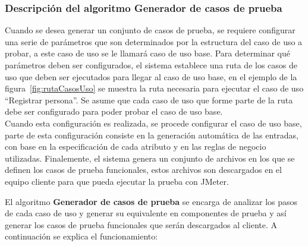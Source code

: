 	\newpage

	\subsubsection{Descripción del algoritmo Generador de casos de prueba}
	
	Cuando se desea generar un conjunto de casos de prueba, se requiere configurar una serie de parámetros que son determinados por la estructura del caso de uso a probar, a este caso de uso se le llamará caso de uso base. Para determinar qué parámetros deben ser configurados, el sistema establece una ruta de los casos de uso que deben ser ejecutados para llegar al caso de uso base, en el ejemplo de la figura~\ref{fig:rutaCasosUso} se muestra la ruta necesaria para ejecutar el caso de uso ``Registrar persona''. Se asume que cada caso de uso que forme parte de la ruta debe ser configurado para poder probar el caso de uso base. \\
	Cuando esta configuración es realizada, se procede configurar el caso de uso base, parte de esta configuración consiste en la generación automática de las entradas, con base en la especificación de cada atributo y en las reglas de negocio utilizadas. Finalemente, el sistema genera un conjunto de archivos en los que se definen los casos de prueba funcionales, estos archivos son descargados en el equipo cliente para que pueda ejecutar la prueba con JMeter.
	
	
	
	El algoritmo {\bf Generador de casos de prueba} se encarga de analizar los pasos de cada caso de uso y generar su equivalente en  componentes de prueba y así generar los casos de prueba funcionales que serán descargados al cliente. A continuación se explica el funcionamiento:\\
		
